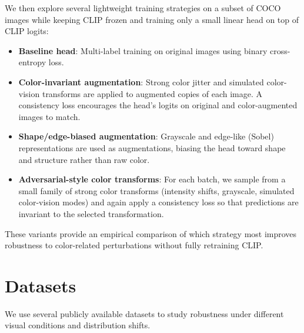 \documentclass[11pt]{article}
\begin{document}
We then explore several lightweight training strategies on a subset of COCO images while keeping CLIP frozen and training only a small linear head on top of CLIP logits:
\begin{itemize}
    \item \textbf{Baseline head}: Multi-label training on original images using binary cross-entropy loss.
    \item \textbf{Color-invariant augmentation}: Strong color jitter and simulated color-vision transforms are applied to augmented copies of each image. A consistency loss encourages the head's logits on original and color-augmented images to match.
    \item \textbf{Shape/edge-biased augmentation}: Grayscale and edge-like (Sobel) representations are used as augmentations, biasing the head toward shape and structure rather than raw color.
    \item \textbf{Adversarial-style color transforms}: For each batch, we sample from a small family of strong color transforms (intensity shifts, grayscale, simulated color-vision modes) and again apply a consistency loss so that predictions are invariant to the selected transformation.
\end{itemize}
These variants provide an empirical comparison of which strategy most improves robustness to color-related perturbations without fully retraining CLIP.

\section{Datasets}

We use several publicly available datasets to study robustness under different visual conditions and distribution shifts.
\end{document}
